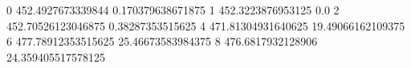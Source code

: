 0 452.4927673339844 0.170379638671875
1 452.3223876953125 0.0
2 452.70526123046875 0.38287353515625
4 471.81304931640625 19.49066162109375
6 477.78912353515625 25.46673583984375
8 476.6817932128906 24.359405517578125
